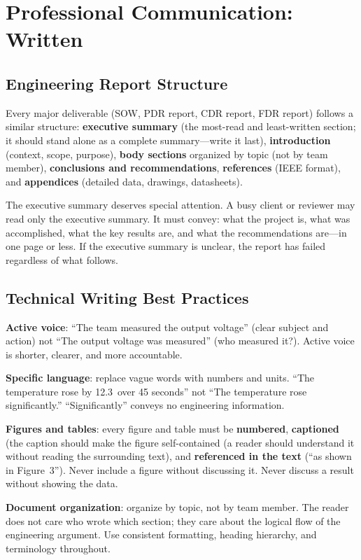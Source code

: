 \chapter{Professional Communication: Written}

\section{Engineering Report Structure}
Every major deliverable (SOW, PDR report, CDR report, FDR report) follows a similar structure: \textbf{executive summary} (the most-read and least-written section; it should stand alone as a complete summary---write it last), \textbf{introduction} (context, scope, purpose), \textbf{body sections} organized by topic (not by team member), \textbf{conclusions and recommendations}, \textbf{references} (IEEE format), and \textbf{appendices} (detailed data, drawings, datasheets).

The executive summary deserves special attention. A busy client or reviewer may read only the executive summary. It must convey: what the project is, what was accomplished, what the key results are, and what the recommendations are---in one page or less. If the executive summary is unclear, the report has failed regardless of what follows.

\section{Technical Writing Best Practices}
\textbf{Active voice}: ``The team measured the output voltage'' (clear subject and action) not ``The output voltage was measured'' (who measured it?). Active voice is shorter, clearer, and more accountable.

\textbf{Specific language}: replace vague words with numbers and units. ``The temperature rose by 12.3\,\degC{} over 45 seconds'' not ``The temperature rose significantly.'' ``Significantly'' conveys no engineering information.

\textbf{Figures and tables}: every figure and table must be \textbf{numbered}, \textbf{captioned} (the caption should make the figure self-contained (a reader should understand it without reading the surrounding text), and \textbf{referenced in the text} (``as shown in Figure~3''). Never include a figure without discussing it. Never discuss a result without showing the data.

\textbf{Document organization}: organize by topic, not by team member. The reader does not care who wrote which section; they care about the logical flow of the engineering argument. Use consistent formatting, heading hierarchy, and terminology throughout.

